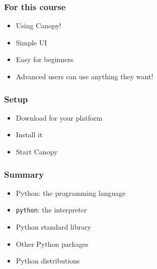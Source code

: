 \documentclass[14pt,compress]{beamer}
\newcommand{\typ}[1]{\lstinline{#1}}
\begin{document}
\begin{frame}[plain]
  \frametitle{For this course}
  \begin{itemize}
  \item Using Canopy!
  \item Simple UI
  \item Easy for beginners
    \vspace*{0.25in}
  \item Advanced users can use anything they want!
  \end{itemize}
\end{frame}

\begin{frame}[plain]
  \frametitle{Setup}
  \begin{itemize}
    \item Download for your platform
    \item Install it
    \item Start Canopy
  \end{itemize}
\end{frame}

\begin{frame}[plain]
  \frametitle{Summary}
  \begin{itemize}
  \item Python: the programming language
  \item \typ{python}: the interpreter
  \item Python standard library
  \item Other Python packages
  \item Python distributions
  \end{itemize}
\end{frame}
\end{document}
